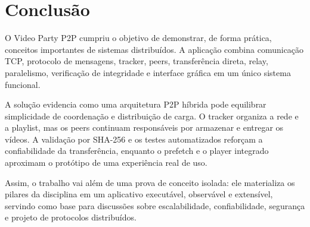\documentclass[
	12pt,
	oneside,
	a4paper,
	chapter=TITLE,
	section=TITLE,
	english,
	brazilian,
	sumario=tradicional
]{abntex2}
\begin{document}
\section{Conclusão}

O Video Party P2P cumpriu o objetivo de demonstrar, de forma prática, conceitos importantes de sistemas distribuídos. A aplicação combina comunicação TCP, protocolo de mensagens, tracker, peers, transferência direta, relay, paralelismo, verificação de integridade e interface gráfica em um único sistema funcional.

A solução evidencia como uma arquitetura P2P híbrida pode equilibrar simplicidade de coordenação e distribuição de carga. O tracker organiza a rede e a playlist, mas os peers continuam responsáveis por armazenar e entregar os vídeos. A validação por SHA-256 e os testes automatizados reforçam a confiabilidade da transferência, enquanto o prefetch e o player integrado aproximam o protótipo de uma experiência real de uso.

Assim, o trabalho vai além de uma prova de conceito isolada: ele materializa os pilares da disciplina em um aplicativo executável, observável e extensível, servindo como base para discussões sobre escalabilidade, confiabilidade, segurança e projeto de protocolos distribuídos.

\newpage

\end{document}
